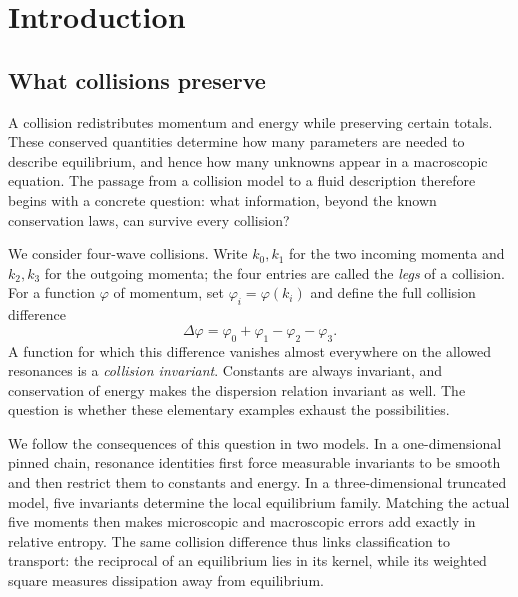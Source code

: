 \section{Introduction}\label{intro:section}

\subsection{What collisions preserve}

A collision redistributes momentum and energy while preserving certain totals.
These conserved quantities determine how many parameters are needed to describe
equilibrium, and hence how many unknowns appear in a macroscopic equation.
The passage from a collision model to a fluid description therefore begins
with a concrete question: what information, beyond the known conservation
laws, can survive every collision?

We consider four-wave collisions. Write $k_0,k_1$ for the two incoming momenta
and $k_2,k_3$ for the outgoing momenta; the four entries are called the
\emph{legs} of a collision. For a function $\varphi$ of momentum, set
$\varphi_i=\varphi(k_i)$ and define the full collision difference
\begin{equation}\label{intro:collision-difference}
 \Delta\varphi=\varphi_0+\varphi_1-\varphi_2-\varphi_3.
\end{equation}
A function for which this difference vanishes almost everywhere on the allowed
resonances is a \emph{collision invariant}. Constants are always invariant,
and conservation of energy makes the dispersion relation invariant as well.
The question is whether these elementary examples exhaust the possibilities.

We follow the consequences of this question in two models. In a one-dimensional
pinned chain, resonance identities first force measurable invariants to be
smooth and then restrict them to constants and energy. In a three-dimensional
truncated model, five invariants determine the local equilibrium family.
Matching the actual five moments then makes microscopic and macroscopic errors
add exactly in relative entropy. The same collision difference thus links
classification to transport: the reciprocal of an equilibrium lies in its
kernel, while its weighted square measures dissipation away from equilibrium.

